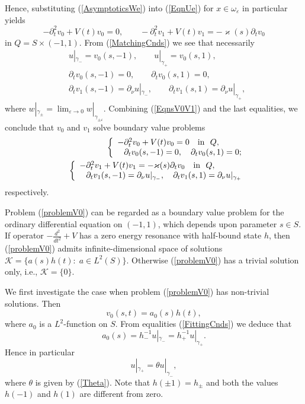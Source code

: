 \documentclass[graybox]{svmult}
\renewcommand{\kappa}{\varkappa}
\newcommand{\eps}{\varepsilon}
\newcommand{\eqref}[1]{(\ref{#1})}
\newcommand{\pte}{\partial_t}
\begin{document}
Hence, substituting \eqref{AsymptoticsWe} into \eqref{EqnUe} for $x\in \omega_\eps$ in particular yields
\begin{equation}\label{EqnsV0V1}
-\pte^2 v_0+V(t)v_0=0, \qquad -\pte^2 v_1+V(t)v_1=-\kappa(s)\pte v_0
\end{equation}
in $Q=S\times(-1,1)$.
From \eqref{MatchingCnds} we see that necessarily
\begin{eqnarray}\label{FittingCnds}
  &u|_{\gamma_-}=v_0(s,-1),\qquad u|_{\gamma_+}=v_0(s,1), \\ \nonumber
  &\partial_t v_0(s,- 1)=0, \qquad \partial_t v_0(s, 1)=0, \\\nonumber
&\partial_t v_1(s, -1)=\partial_\nu u|_{\gamma_-}, \qquad
\partial_t v_1(s, 1)=\partial_\nu u|_{\gamma_+},
\end{eqnarray}
where $w|_{\gamma_\pm}=\lim_{\eps\to 0}w|_{\gamma_{\pm\eps}}$.
Combining \eqref{EqnsV0V1} and the last equalities, we conclude that $v_0$ and $v_1$ solve boundary value problems
\begin{eqnarray}\label{problemV0}
&&\left\{
  \begin{array}{ll}
    -\pte^2 v_0+V(t)v_0=0 \quad \hbox{in \ } Q, \\
    \phantom{-}\partial_t v_0(s,- 1)=0, \quad \partial_t v_0(s, 1)=0;
  \end{array}
\right.\\\label{problemV1}
&&\left\{
  \begin{array}{ll}
    -\pte^2 v_1+V(t)v_1=-\kappa(s)\pte v_0\quad \hbox{in \ } Q, \\
    \phantom{-}\partial_t v_1(s, -1)=\partial_\nu u|_{\gamma_-}, \quad
\partial_t v_1(s, 1)=\partial_\nu u|_{\gamma_+}
  \end{array}
\right.
\end{eqnarray}
respectively.

Problem \eqref{problemV0} can be regarded as a boundary value problem for the ordinary differential equation on $(-1,1)$, which depends upon parameter $s\in S$. If operator $-\frac{d^2}{dt^2}+V$ has a zero energy resonance with half-bound state $h$, then \eqref{problemV0}  admits infinite-dimensional space of solutions $\mathcal{K}=\{a(s)h(t)\colon \;a\in L^2(S)\}$. Otherwise  \eqref{problemV0} has a trivial solution only, i.e., $\mathcal{K}=\{0\}$.

We first investigate the case when problem \eqref{problemV0} has non-trivial solutions. Then
$$
v_0(s,t)=a_0(s)h(t),
$$
where $a_0$ is a $L^2$-function on $S$. From equalities \eqref{FittingCnds} we deduce that
$$
   a_0(s)=h_-^{-1}u|_{\gamma_-}=h_+^{-1}u|_{\gamma_+}.
$$
Hence in particular
\begin{equation}\label{RCond0}
     u|_{\gamma_+}=\theta u|_{\gamma_-},
\end{equation}
where $\theta$ is given by \eqref{Theta}. Note that $h(\pm 1)=h_\pm$ and both the values $h(-1)$ and $h(1)$ are different from zero.
\end{document}

